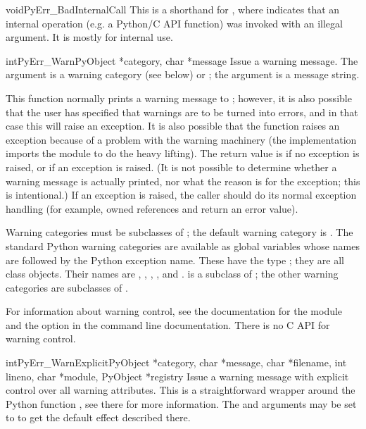 \begin{cfuncdesc}{void}{PyErr_BadInternalCall}{}
  This is a shorthand for , where  indicates that an internal
  operation (e.g. a Python/C API function) was invoked with an illegal
  argument.  It is mostly for internal use.
\end{cfuncdesc}

\begin{cfuncdesc}{int}{PyErr_Warn}{PyObject *category, char *message}
  Issue a warning message.  The  argument is a warning
  category (see below) or \NULL; the  argument is a
  message string.

  This function normally prints a warning message to ;
  however, it is also possible that the user has specified that
  warnings are to be turned into errors, and in that case this will
  raise an exception.  It is also possible that the function raises an
  exception because of a problem with the warning machinery (the
  implementation imports the  module to do the heavy
  lifting).  The return value is  if no exception is raised,
  or  if an exception is raised.  (It is not possible to
  determine whether a warning message is actually printed, nor what
  the reason is for the exception; this is intentional.)  If an
  exception is raised, the caller should do its normal exception
  handling (for example,  owned references and
  return an error value).

  Warning categories must be subclasses of ; the
  default warning category is .  The standard
  Python warning categories are available as global variables whose
  names are  followed by the Python exception name.
  These have the type ; they are all class objects.
  Their names are , ,
  , , and
  .   is a subclass
  of ; the other warning categories are
  subclasses of .

  For information about warning control, see the documentation for the
   module and the  option in the
  command line documentation.  There is no C API for warning control.
\end{cfuncdesc}

\begin{cfuncdesc}{int}{PyErr_WarnExplicit}{PyObject *category, char *message,
                char *filename, int lineno, char *module, PyObject *registry}
  Issue a warning message with explicit control over all warning
  attributes.  This is a straightforward wrapper around the Python
  function , see there for more
  information.  The  and  arguments may be
  set to \NULL{} to get the default effect described there.
\end{cfuncdesc}

